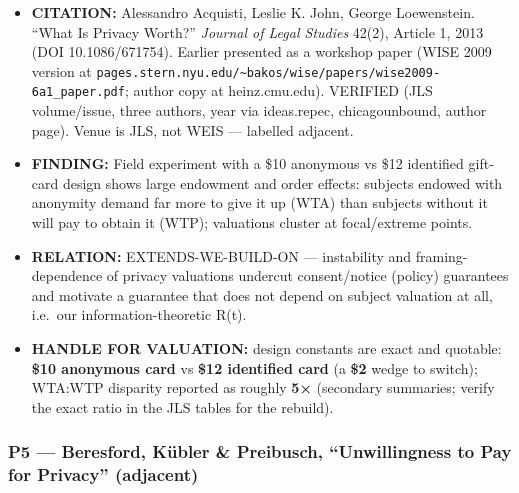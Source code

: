 \documentclass[
  11pt,
]{article}
\providecommand{\tightlist}{%
  \setlength{\itemsep}{0pt}\setlength{\parskip}{0pt}}
\begin{document}
\begin{itemize}
\tightlist
\item
  \textbf{CITATION:} Alessandro Acquisti, Leslie K. John, George
  Loewenstein. ``What Is Privacy Worth?'' \emph{Journal of Legal
  Studies} 42(2), Article 1, 2013 (DOI 10.1086/671754). Earlier
  presented as a workshop paper (WISE 2009 version at
  \texttt{pages.stern.nyu.edu/\textasciitilde{}bakos/wise/papers/wise2009-6a1\_paper.pdf};
  author copy at heinz.cmu.edu). VERIFIED (JLS volume/issue, three
  authors, year via ideas.repec, chicagounbound, author page). Venue is
  JLS, not WEIS --- labelled adjacent.
\item
  \textbf{FINDING:} Field experiment with a \$10 anonymous vs \$12
  identified gift-card design shows large endowment and order effects:
  subjects endowed with anonymity demand far more to give it up (WTA)
  than subjects without it will pay to obtain it (WTP); valuations
  cluster at focal/extreme points.
\item
  \textbf{RELATION:} EXTENDS-WE-BUILD-ON --- instability and
  framing-dependence of privacy valuations undercut consent/notice
  (policy) guarantees and motivate a guarantee that does not depend on
  subject valuation at all, i.e.~our information-theoretic R(t).
\item
  \textbf{HANDLE FOR VALUATION:} design constants are exact and
  quotable: \textbf{\$10 anonymous card} vs \textbf{\$12 identified
  card} (a \textbf{\$2} wedge to switch); WTA:WTP disparity reported as
  roughly \textbf{5×} (secondary summaries; verify the exact ratio in
  the JLS tables for the rebuild).
\end{itemize}

\subsubsection{P5 --- Beresford, Kübler \& Preibusch, ``Unwillingness to
Pay for Privacy''
(adjacent)}\label{p5-beresford-kuxfcbler-preibusch-unwillingness-to-pay-for-privacy-adjacent}
\end{document}
